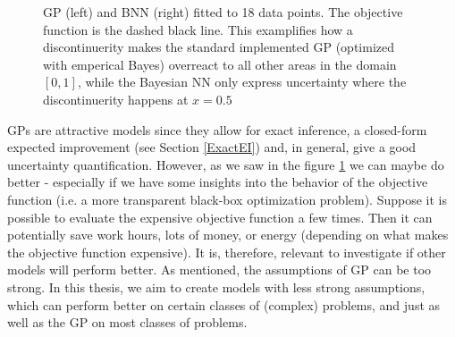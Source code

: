 \begin{figure}[H]%
    \centering
    \qquad
    \caption{GP (left) and BNN (right) fitted to 18 data points. The objective function is the
    dashed black line. This examplifies how a discontinuerity makes the standard implemented GP
    (optimized with emperical Bayes) overreact to all other areas in the domain $[0,1]$, while the
    Bayesian NN only express uncertainty where the discontinuerity happens at $x =
    0.5$}\label{GP_vs_BNN}
\end{figure}



GPs are attractive models since they allow for exact inference, a closed-form expected improvement
 (see Section \ref{ExactEI}) and, in general, give a good uncertainty quantification. However, as we saw in
 the figure \ref{GP_vs_BNN} we can maybe do better - especially if we have some insights into
 the behavior of the objective function (i.e. a more transparent black-box optimization
 problem). Suppose it is possible to evaluate the expensive objective function a few times. Then it
 can potentially save work hours, lots of money, or energy (depending on what makes the objective
 function expensive). It is, therefore, relevant to investigate if other models will perform better.
 As mentioned, the assumptions of GP can be too strong. In this thesis, we aim to create models with
 less strong assumptions, which can perform better on certain classes of (complex) problems, and
 just as well as the GP on most classes of problems. 

